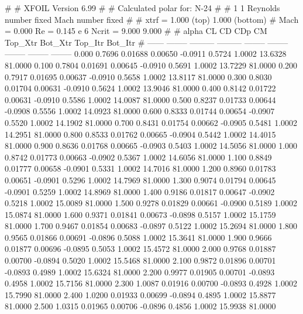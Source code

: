#  
#       XFOIL         Version 6.99
#  
# Calculated polar for: N-24                                            
#  
# 1 1 Reynolds number fixed          Mach number fixed         
#  
# xtrf =   1.000 (top)        1.000 (bottom)  
# Mach =   0.000     Re =     0.145 e 6     Ncrit =   9.000  9.000
#  
#   alpha    CL        CD       CDp       CM     Top_Xtr  Bot_Xtr  Top_Itr  Bot_Itr
#  ------ -------- --------- --------- -------- -------- -------- -------- --------
   0.000   0.7696   0.01688   0.00650  -0.0911   0.5724   1.0002  13.6328  81.0000
   0.100   0.7804   0.01691   0.00645  -0.0910   0.5691   1.0002  13.7229  81.0000
   0.200   0.7917   0.01695   0.00637  -0.0910   0.5658   1.0002  13.8117  81.0000
   0.300   0.8030   0.01704   0.00631  -0.0910   0.5624   1.0002  13.9046  81.0000
   0.400   0.8142   0.01722   0.00631  -0.0910   0.5586   1.0002  14.0087  81.0000
   0.500   0.8237   0.01733   0.00644  -0.0908   0.5556   1.0002  14.0923  81.0000
   0.600   0.8333   0.01744   0.00654  -0.0907   0.5520   1.0002  14.1902  81.0000
   0.700   0.8431   0.01754   0.00662  -0.0905   0.5481   1.0002  14.2951  81.0000
   0.800   0.8533   0.01762   0.00665  -0.0904   0.5442   1.0002  14.4015  81.0000
   0.900   0.8636   0.01768   0.00665  -0.0903   0.5403   1.0002  14.5056  81.0000
   1.000   0.8742   0.01773   0.00663  -0.0902   0.5367   1.0002  14.6056  81.0000
   1.100   0.8849   0.01777   0.00658  -0.0901   0.5331   1.0002  14.7016  81.0000
   1.200   0.8960   0.01783   0.00651  -0.0901   0.5296   1.0002  14.7969  81.0000
   1.300   0.9074   0.01794   0.00645  -0.0901   0.5259   1.0002  14.8969  81.0000
   1.400   0.9186   0.01817   0.00647  -0.0902   0.5218   1.0002  15.0089  81.0000
   1.500   0.9278   0.01829   0.00661  -0.0900   0.5189   1.0002  15.0874  81.0000
   1.600   0.9371   0.01841   0.00673  -0.0898   0.5157   1.0002  15.1759  81.0000
   1.700   0.9467   0.01854   0.00683  -0.0897   0.5122   1.0002  15.2694  81.0000
   1.800   0.9565   0.01866   0.00691  -0.0896   0.5088   1.0002  15.3641  81.0000
   1.900   0.9666   0.01877   0.00696  -0.0895   0.5053   1.0002  15.4572  81.0000
   2.000   0.9768   0.01887   0.00700  -0.0894   0.5020   1.0002  15.5468  81.0000
   2.100   0.9872   0.01896   0.00701  -0.0893   0.4989   1.0002  15.6324  81.0000
   2.200   0.9977   0.01905   0.00701  -0.0893   0.4958   1.0002  15.7156  81.0000
   2.300   1.0087   0.01916   0.00700  -0.0893   0.4928   1.0002  15.7990  81.0000
   2.400   1.0200   0.01933   0.00699  -0.0894   0.4895   1.0002  15.8877  81.0000
   2.500   1.0315   0.01965   0.00706  -0.0896   0.4856   1.0002  15.9938  81.0000
